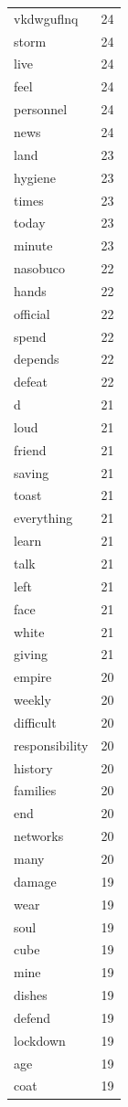 \begin{tabular}{lr}
vkdwguflnq & 24 \\
storm & 24 \\
live & 24 \\
feel & 24 \\
personnel & 24 \\
news & 24 \\
land & 23 \\
hygiene & 23 \\
times & 23 \\
today & 23 \\
minute & 23 \\
nasobuco & 22 \\
hands & 22 \\
official & 22 \\
spend & 22 \\
depends & 22 \\
defeat & 22 \\
d & 21 \\
loud & 21 \\
friend & 21 \\
saving & 21 \\
toast & 21 \\
everything & 21 \\
learn & 21 \\
talk & 21 \\
left & 21 \\
face & 21 \\
white & 21 \\
giving & 21 \\
empire & 20 \\
weekly & 20 \\
difficult & 20 \\
responsibility & 20 \\
history & 20 \\
families & 20 \\
end & 20 \\
networks & 20 \\
many & 20 \\
damage & 19 \\
wear & 19 \\
soul & 19 \\
cube & 19 \\
mine & 19 \\
dishes & 19 \\
defend & 19 \\
lockdown & 19 \\
age & 19 \\
coat & 19 \\

\end{tabular}
